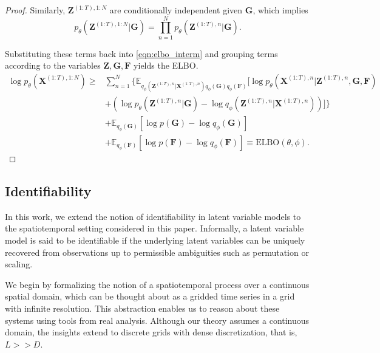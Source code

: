\begin{proof}
Similarly, $\mathbf{Z}^{(1:T), 1:N}$ are conditionally independent given $\mathbf{G}$, which implies
\begin{equation*}
    p_{\theta} \left( \mathbf{Z}^{(1:T), 1:N} | \mathbf{G} \right) = \prod_{n=1}^N p_\theta \left( \mathbf{Z}^{(1:T), n} |  \mathbf{G} \right).
\end{equation*}

Substituting these terms back into \eqref{eqn:elbo_interm} and grouping terms according to the variables $\mathbf{Z}, \mathbf{G}, \mathbf{F}$ yields the ELBO.
\begin{align*}
    \log p_{\theta} \left( \mathbf{X}^{(1:T), 1:N} \right)
    \geq & \sum_{n=1}^N \Bigg\{ \mathbb{E}_{q_{\phi}(\mathbf{Z}^{(1:T), n}|\mathbf{X}^{(1:T), n}) q_{\phi}(\mathbf{G}) q_{\phi}(\mathbf{F})} \Bigg[ \log p_{\theta}\left( \mathbf{X}^{(1:T), n} | \mathbf{Z}^{(1:T), n}, \mathbf{G}, \mathbf{F} \right) \\
    & + \left( \log p_{\theta}\left( \mathbf{Z}^{(1:T), n} | \mathbf{G} \right) - \log q_{\phi}\left( \mathbf{Z}^{(1:T), n} | \mathbf{X}^{(1:T), n} \right) \right) \Bigg] \Bigg\} \\
    & + \mathbb{E}_{q_{\phi}(\mathbf{G})} \left[ \log p(\mathbf{G}) - \log q_{\phi}(\mathbf{G}) \right] \\
    & + \mathbb{E}_{q_{\phi}(\mathbf{F})} \left[ \log p(\mathbf{F}) - \log q_{\phi}(\mathbf{F}) \right] \equiv \text{ELBO}(\theta, \phi).
\end{align*}

\end{proof}



\subsection{Identifiability} \label{app:identifiability}

In this work, we extend the notion of identifiability in latent variable models to the spatiotemporal setting considered in this paper. Informally, a latent variable model is said to be identifiable if the underlying latent variables can be uniquely recovered from observations up to permissible ambiguities such as permutation or scaling. 

We begin by formalizing the notion of a spatiotemporal process over a continuous spatial domain, which can be thought about as a gridded time series in a grid with infinite resolution. This abstraction enables us to reason about these systems using tools from real analysis. Although our theory assumes a continuous domain, the insights extend to discrete grids with dense discretization, that is, $L >> D$.

